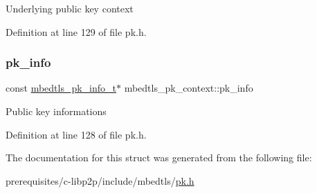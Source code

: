 Underlying public key context 

Definition at line 129 of file pk.\+h.

\mbox{\label{structmbedtls__pk__context_a3dac25bf08a411a2479107e14fa90550}} 
\subsubsection{\texorpdfstring{pk\+\_\+info}{pk\_info}}
{\footnotesize\ttfamily const \mbox{\hyperlink{structmbedtls__pk__info__t}{mbedtls\+\_\+pk\+\_\+info\+\_\+t}}$\ast$ mbedtls\+\_\+pk\+\_\+context\+::pk\+\_\+info}

Public key informations 

Definition at line 128 of file pk.\+h.



The documentation for this struct was generated from the following file\+:\begin{DoxyCompactItemize}
\item 
prerequisites/c-\/libp2p/include/mbedtls/\mbox{\hyperlink{pk_8h}{pk.\+h}}\end{DoxyCompactItemize}
